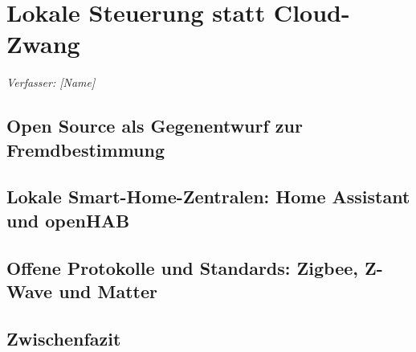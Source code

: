 \chapter{Lokale Steuerung statt Cloud-Zwang}\label{chap:lokale-steuerung}
\noindent\textit{Verfasser: [Name]}


\section{Open Source als Gegenentwurf zur Fremdbestimmung}\label{sec:lokal-opensource}

\section{Lokale Smart-Home-Zentralen: Home Assistant und openHAB}\label{sec:lokal-zentralen}

\section{Offene Protokolle und Standards: Zigbee, Z-Wave und Matter}\label{sec:lokal-standards}

\section{Zwischenfazit}\label{sec:lokal-zwischenfazit}

